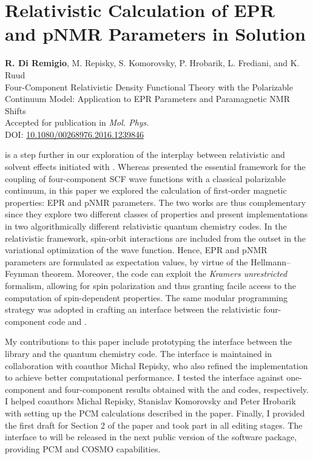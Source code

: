 \section{Relativistic Calculation of EPR and pNMR Parameters in
Solution}\label{sec:pcmepr}

\begin{tcolorbox}
  {\small
  \textbf{R. Di Remigio}, M. Repisky, S. Komorovsky, P. Hrobarik, L.
  Frediani, and K. Ruud
  \\
  \textsf{
  Four-Component Relativistic Density Functional Theory with the
  Polarizable Continuum Model: Application to EPR Parameters
  and Paramagnetic NMR Shifts
  }
  \\
  Accepted for publication in \textit{Mol. Phys.}
  \\
  DOI: \url{10.1080/00268976.2016.1239846}
  }
\end{tcolorbox}

 is a step further in our exploration of the interplay between
relativistic and solvent effects initiated with .
Whereas  presented the essential framework for the coupling of
four-component \acrshort{SCF} wave functions with a classical polarizable continuum,
in this paper we explored the calculation of first-order magnetic properties:
\gls{EPR} and \gls{pNMR} parameters.\autocite{Repisky2010-ls, Malkin2011-nm,
Komorovsky2013-xa, Cherry2016-ij}
The two works are thus complementary since they explore two different classes
of properties and present implementations in two algorithmically different
relativistic quantum chemistry codes.
In the relativistic framework, spin-orbit interactions are included from the
outset in the variational optimization of the wave function.
Hence, \acrshort{EPR} and \acrshort{pNMR} parameters are formulated as expectation
values, by virtue of the Hellmann--Feynman theorem.\autocite{Konishi2009-zb,
Helgaker2000-tz}
Moreover, the \ReSpect code can exploit the \emph{Kramers unrestricted} formalism,
allowing for spin polarization and thus granting facile access to the computation
of spin-dependent properties.\autocite{Dyall2007-tu}
The same modular programming strategy was adopted in crafting an interface between the
relativistic four-component code \ReSpect\autocite{ReSpect-3.5.0} and \pcmsolver.

My contributions to this paper include prototyping the interface between the
\pcmsolver library and the \ReSpect quantum chemistry code.
The interface is maintained in collaboration with coauthor Michal Repisky, who also
refined the implementation to achieve better computational performance.
I tested the interface against one-component and four-component results obtained with
the \LSDALTON and \DIRAC codes, respectively.
I helped coauthors Michal Repisky, Stanislav Komorovsky and Peter Hrobarik
with setting up the \acrshort{PCM} calculations described in the paper.
Finally, I provided the first draft for Section 2 of the paper and took part in all editing stages.
The interface to \ReSpect will be released in the next public version of the software
package, providing \acrshort{PCM} and \acrshort{COSMO} capabilities.

